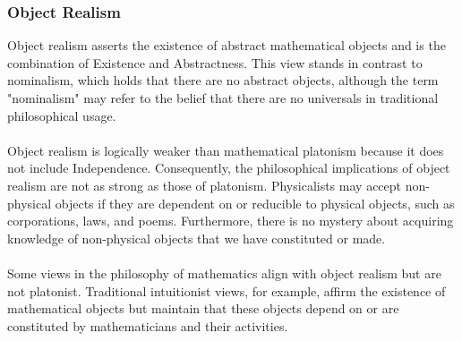 \documentclass[10pt,a4paper]{article}
\begin{document}
                    \subsubsection{Object Realism}
                        Object realism asserts the existence of abstract mathematical objects and is the combination of Existence and Abstractness. This view stands in contrast to nominalism, which holds that there are no abstract objects, although the term "nominalism" may refer to the belief that there are no universals in traditional philosophical usage. 
                        \\
                        \\
                        Object realism is logically weaker than mathematical platonism because it does not include Independence. Consequently, the philosophical implications of object realism are not as strong as those of platonism. Physicalists may accept non-physical objects if they are dependent on or reducible to physical objects, such as corporations, laws, and poems. Furthermore, there is no mystery about acquiring knowledge of non-physical objects that we have constituted or made.
                        \\
                        \\
                        Some views in the philosophy of mathematics align with object realism but are not platonist. Traditional intuitionist views, for example, affirm the existence of mathematical objects but maintain that these objects depend on or are constituted by mathematicians and their activities. 
\end{document}
